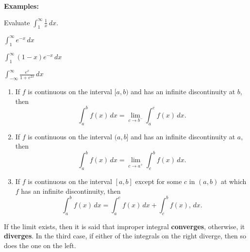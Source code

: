 \textbf{Examples:}
\begin{questions}
    \question Evaluate $\displaystyle\int_1^\infty \frac{1}{x}\,dx$.
    
    \newpage
    
    \begin{minipage}{.45\linewidth}
        \question $\displaystyle\int_1^\infty e^{-x}\,dx$
    \end{minipage}
    \hfill
    \begin{minipage}{.45\linewidth}
        \question $\displaystyle\int_1^\infty (1-x)e^{-x} \,dx$
    \end{minipage}

    
    
    \question $\displaystyle\int_{-\infty}^\infty\frac{e^x}{1+e^{2x}}\,dx$


\end{questions}

\newpage


\begin{tcolorbox}[title= DEFINITION OF IMPROPER INTEGRALS WITH INFINITE DISCONTINUITIES,colframe=black,sharp corners,colback=white,colbacktitle=white,coltitle=black]

    \begin{enumerate}
        \item If $f$ is continuous on the interval $[a,b)$ and has an infinite discontinuity at $b$, then 
        \[\int_a^b f(x)\,dx=\lim_{c\to b^-}\int_a^c f(x)\,dx.\]
        \item If $f$ is continuous on the interval $(a,b]$ and has an infinite discontinuity at $a$, then 
        \[\int_a^b f(x)\,dx=\lim_{c\to a^+}\int_c^b f(x)\,dx.\]
        \item If $f$ is continuous on the interval $[a,b]$ except for some $c$ in $(a,b)$ at which $f$ has an infinite discontinuity, then 
        \[\int_a^b f(x)\,dx=\int_{a}^c f(x)\,dx + \int_c^{b} f(x),\,dx.\]
    \end{enumerate}
    
    If the limit exists, then it is said that improper integral \textbf{converges}, otherwise, it \textbf{diverges}. In the third case, if either of the integrals on the right diverge, then so does the one on the left.

\end{tcolorbox}


